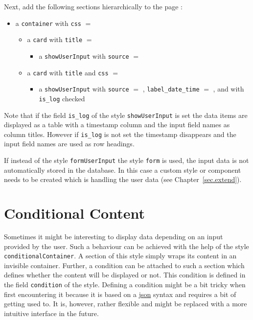 \documentclass[a4paper,oneside]{book}
\begin{document}
Next, add the following sections hierarchically to the page :
\begin{itemize}
    \item a \texttt{container} with \texttt{css} $=$ 
        \begin{itemize}
            \item a \texttt{card} with \texttt{title} $=$ 
                \begin{itemize}
                    \item a \texttt{showUserInput} with \texttt{source} $=$ 
                \end{itemize}
            \item a \texttt{card} with \texttt{title}  and \texttt{css} $=$ 
                \begin{itemize}
                    \item a \texttt{showUserInput} with \texttt{source} $=$ , \texttt{label\_date\_time} $=$ , and with \texttt{is\_log} checked
                \end{itemize}
        \end{itemize}
\end{itemize}

Note that if the field \texttt{is\_log} of the style \texttt{showUserInput} is set the data items are displayed as a table with a timestamp column and the input field names as column titles.
However if \texttt{is\_log} is not set the timestamp disappears and the input field names are used as row headings.

If instead of the style \texttt{formUserInput} the style \texttt{form} is used, the input data is not automatically stored in the database.
In this case a custom style or component needs to be created which is handling the user data (see Chapter~\ref{sec.extend}).

\section{Conditional Content}
Sometimes it might be interesting to display data depending on an input provided by the user.
Such a behaviour can be achieved with the help of the style \texttt{conditionalContainer}.
A section of this style simply wraps its content in an invisible container.
Further, a condition can be attached to such a section which defines whether the content will be displayed or not.
This condition is defined in the field \texttt{condition} of the style.
Defining a condition might be a bit tricky when first encountering it because it is based on a \href{http://www.json.org/}{json} syntax and requires a bit of getting used to.
It is, however, rather flexible and might be replaced with a more intuitive interface in the future.
\end{document}

